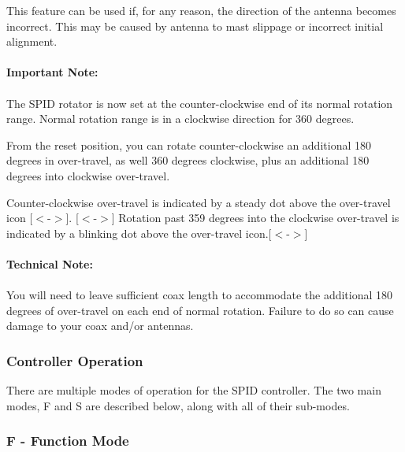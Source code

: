 \documentclass[11pt]{article} %
\begin{document}
This feature can be used if, for any reason, the direction of the antenna becomes incorrect. This may be caused by antenna to mast slippage or incorrect initial alignment.
\\ \\
\textbf{Important Note:}
\\ \\
The SPID rotator is now set at the counter-clockwise end of its normal rotation range. Normal rotation range is in a clockwise direction for 360 degrees.

From the reset position, you can rotate counter-clockwise an additional 180 degrees in over-travel, as well 360 degrees clockwise, plus an additional 180 degrees into clockwise over-travel.

Counter-clockwise over-travel is indicated by a steady dot above the over-travel icon [$<$-$>$]. [$<$-$>$] Rotation past 359 degrees into the clockwise over-travel is indicated by a blinking dot above the over-travel icon.[$<$-$>$]
\\ \\
\textbf{Technical Note:}
\\ \\
You will need to leave sufficient coax length to accommodate the additional 180 degrees of over-travel on each end of normal rotation. Failure to do so can cause damage to your coax and/or antennas.

\subsubsection{Controller Operation}

There are multiple modes of operation for the SPID controller. The two main modes, F and S are described below, along with all of their sub-modes.

\subsubsection{F - Function Mode}
\end{document}

